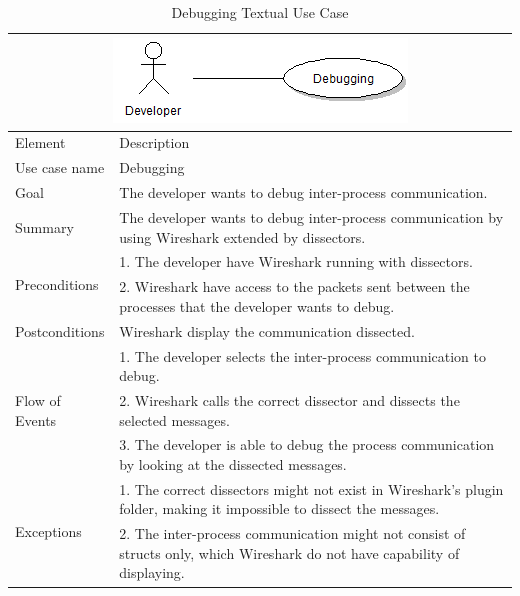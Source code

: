 \begin{table}[htbp] \footnotesize \center
\caption{Debugging Textual Use Case\label{tab:textual:debugging}}
\begin{tabularx}{\textwidth}{l X}
	\multicolumn{2}{c}{\includegraphics[scale=0.8]{./planning/img/uc_debugging}} \\
	\toprule
	Element & Description\\
	\midrule
	Use case name & Debugging\\
	Goal & The developer wants to debug inter-process communication.\\
	Summary & The developer wants to debug inter-process communication by using Wireshark extended by dissectors. \\
	\multirow{2}{*}{Preconditions} & 1. The developer have Wireshark running with dissectors.\\
	& 2. Wireshark have access to the packets sent between the processes that the developer wants to debug. \\
	Postconditions & Wireshark display the communication dissected.\\
	\midrule
	\multirow{3}{*}{Flow of Events} & 1. The developer selects the inter-process communication to debug. \\
	& 2. Wireshark calls the correct dissector and dissects the selected messages. \\
	& 3. The developer is able to debug the process communication by looking at the dissected messages. \\
	\midrule
	\multirow{2}{*}{Exceptions} & 1. The correct dissectors might not exist in Wireshark's plugin folder, making it impossible to dissect the messages. \\
	& 2. The inter-process communication might not consist of structs only, which Wireshark do not have capability of displaying. \\
	\bottomrule
\end{tabularx}
\end{table}

